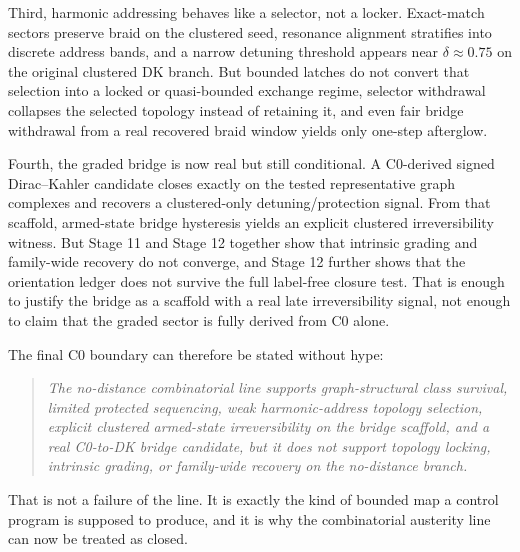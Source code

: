 \documentclass[11pt]{article}
\begin{document}
Third, harmonic addressing behaves like a selector, not a locker. Exact-match sectors preserve braid on the clustered seed, resonance alignment stratifies into discrete address bands, and a narrow detuning threshold appears near $\delta \approx 0.75$ on the original clustered DK branch. But bounded latches do not convert that selection into a locked or quasi-bounded exchange regime, selector withdrawal collapses the selected topology instead of retaining it, and even fair bridge withdrawal from a real recovered braid window yields only one-step afterglow.

Fourth, the graded bridge is now real but still conditional. A C0-derived signed Dirac--Kahler candidate closes exactly on the tested representative graph complexes and recovers a clustered-only detuning/protection signal. From that scaffold, armed-state bridge hysteresis yields an explicit clustered irreversibility witness. But Stage 11 and Stage 12 together show that intrinsic grading and family-wide recovery do not converge, and Stage 12 further shows that the orientation ledger does not survive the full label-free closure test. That is enough to justify the bridge as a scaffold with a real late irreversibility signal, not enough to claim that the graded sector is fully derived from C0 alone.

The final C0 boundary can therefore be stated without hype:
\begin{quote}
\emph{The no-distance combinatorial line supports graph-structural class survival, limited protected sequencing, weak harmonic-address topology selection, explicit clustered armed-state irreversibility on the bridge scaffold, and a real C0-to-DK bridge candidate, but it does not support topology locking, intrinsic grading, or family-wide recovery on the no-distance branch.}
\end{quote}

That is not a failure of the line. It is exactly the kind of bounded map a control program is supposed to produce, and it is why the combinatorial austerity line can now be treated as closed.
\end{document}
